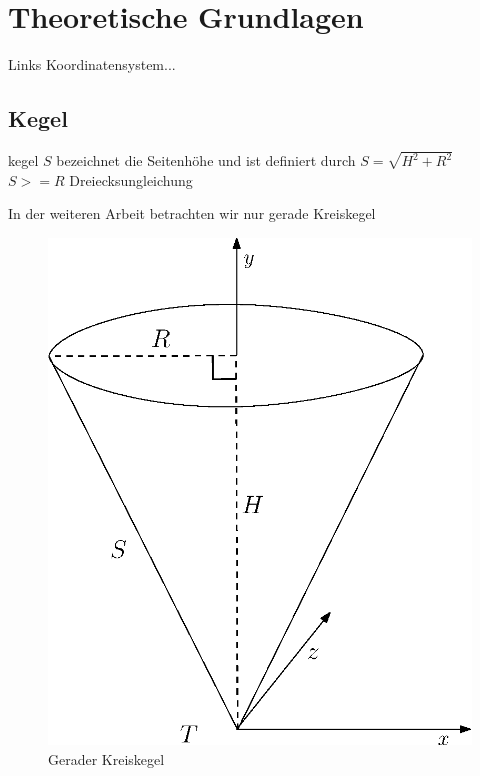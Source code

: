 \chapter{Theoretische Grundlagen}
\label{ch:theory}

Links Koordinatensystem...

\section{Kegel}
\label{s:cone}

\begin{definition}[Kegel]
	kegel
	$S$ bezeichnet die Seitenhöhe und ist definiert durch $S = \sqrt{H^2 + R^2}$
	$S >= R$ Dreiecksungleichung
\end{definition}

In der weiteren Arbeit betrachten wir nur gerade Kreiskegel

\begin{figure}[!htb]
	\centering
	\includegraphics[scale=.5]{images/fullCone.eps}
	\caption{Gerader Kreiskegel}
	\label{fig:cone}
\end{figure}

